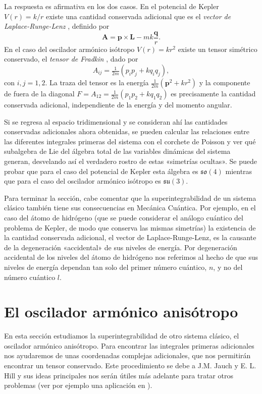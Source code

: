 \documentclass[11pt,a4paper,twoside]{article}
\theoremstyle{definition} \newtheorem{defn}[thm]{Definición}
\theoremstyle{definition} \newtheorem{ejemplo}[thm]{Ejemplo}
\theoremstyle{definition} \newtheorem{ejercicio}[thm]{Ejercicio}
\theoremstyle{remark} \newtheorem*{obs}{Observación}
\newcommand{\vect}[1]{\mathbf{#1}}
\begin{document}
La respuesta es afirmativa en los dos casos. En el potencial de Kepler $V(r)=k/r$ existe una cantidad conservada adicional que es el \emph{vector de Laplace-Runge-Lenz} \cite{goldstein}, definido por
\begin{equation}
  \vect{A}=\vect{p}\times \vect{L}-mk\frac{\vect{q}}{r}. 
\end{equation}
En el caso del oscilador armónico isótropo $V(r)=kr^2$ existe un tensor simétrico conservado, el \emph{tensor de Fradkin} \cite{fradkin}, dado por
\begin{equation}
  A_{ij}=\tfrac{1}{2m}(p_ip_j+kq_iq_j), 
\end{equation}
con $i,j=1,2$. La traza del tensor es la energía $\tfrac{1}{2m}(\vect{p}^2+kr^2)$ y la componente de fuera de la diagonal $F=A_{12}=\tfrac{1}{2m}(p_1p_2+kq_1q_2)$ es precisamente la cantidad conservada adicional, independiente de la energía y del momento angular. 

Si se regresa al espacio tridimensional y se consideran ahí las cantidades conservadas adicionales ahora obtenidas, se pueden calcular las relaciones entre las diferentes integrales primeras del sistema con el corchete de Poisson y ver qué subalgebra de Lie del álgebra total de las variables dinámicas del sistema generan, desvelando así el verdadero rostro de estas «simetrías ocultas». Se puede probar que para el caso del potencial de Kepler esta álgebra es $\mathfrak{so}(4)$ mientras que para el caso del oscilador armónico isótropo es $\mathfrak{su}(3)$.

Para terminar la sección, cabe comentar que la superintegrabilidad de un sistema clásico también tiene sus consecuencias en Mecánica Cuántica. Por ejemplo, en el caso del átomo de hidrógeno (que se puede considerar el análogo cuántico del problema de Kepler, de modo que conserva las mismas simetrías) la existencia de la cantidad conservada adicional, el vector de Laplace-Runge-Lenz, es la causante de la degeneración «accidental» de sus niveles de energía. Por degeneración accidental de los niveles del átomo de hidrógeno nos referimos al hecho de que sus niveles de energía dependan tan solo del primer número cuántico, $n$, y no del número cuántico $l$.

\section{El oscilador armónico anisótropo}\label{anisotropo}
En esta sección estudiamos la superintegrabilidad de otro sistema clásico, el oscilador armónico anisótropo. Para encontrar las integrales primeras adicionales nos ayudaremos de unas coordenadas complejas adicionales, que nos permitirán encontrar un tensor conservado. Este procedimiento se debe a J.M. Jauch y E. L. Hill \cite{jauchhill} y sus ideas principales nos serán útiles más adelante para tratar otros problemas (ver por ejemplo una aplicación en \cite{rodriguez}).
\end{document}
